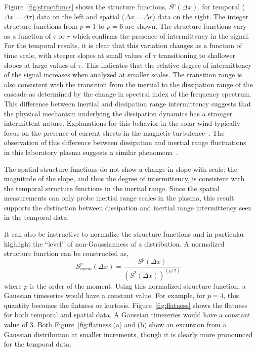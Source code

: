 \documentclass[preprint2]{aastex}
\begin{document}
Figure~\ref{fig:structfuncs} shows the structure functions, $S^{p}(\Delta x)$, for temporal ($\Delta x = \Delta \tau$) data on the left and spatial ($\Delta x = \Delta r$) data on the right. The integer structure functions from $p=1$ to $p=6$ are shown. The structure functions vary as a function of $\tau$ or $r$ which confirms the presence of intermittency in the signal. For the temporal results, it is clear that this variation changes as a function of time scale, with steeper slopes at small values of $\tau$ transitioning to shallower slopes at large values of $\tau$. This indicates that the relative degree of intermittency of the signal increases when analyzed at smaller scales. The transition range is also consistent with the transition from the inertial to the dissipation range of the cascade as determined by the change in spectral index of the frequency spectrum. This difference between inertial and dissipation range intermittency suggests that the physical mechanism underlying the dissipation dynamics has a stronger intermittent nature. Explanations for this behavior in the solar wind typically focus on the presence of current sheets in the magnetic turbulence~\citep{osman2014}. The observation of this difference between dissipation and inertial range fluctuations in this laboratory plasma suggests a similar phenomena~\citep{schaffner2014b}. 

The spatial structure functions do not show a change in slope with scale; the magnitude of the slope, and thus the degree of intermittency, is consistent with the temporal structure functions in the inertial range. Since the spatial measurements can only probe inertial range scales in the plasma, this result supports the distinction between dissipation and inertial range intermittency seen in the temporal data.

It can also be instructive to normalize the structure functions and in particular highlight the ``level'' of non-Gaussianness of a distribution. A normalized structure function can be constructed as,
\begin{equation}
S_{norm}^{p}(\Delta x) = \frac{S^{p}(\Delta x)}{(S^2(\Delta x))^{(p/2)}}
\label{eq:normstructfunc}
\end{equation}
where $p$ is the order of the moment. Using this normalized structure function, a Gaussian timeseries would have a constant value. For example, for $p=4$, this quantity becomes the flatness or kurtosis. Figure~\ref{fig:flatness} shows the flatness for both temporal and spatial data. A Gaussian timeseries would have a constant value of 3. Both Figure~\ref{fig:flatness}(a) and (b) show an excursion from a Gaussian distribution at smaller increments, though it is clearly more pronounced for the temporal data.
\end{document}
